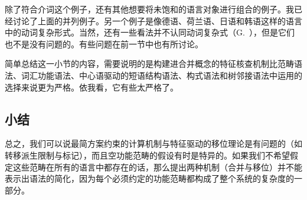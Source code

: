 除了符合介词这个例子，还有其他想要将未饱和的语言对象进行组合的例子。我已经讨论了上面的并列例子。另一个例子是像德语、荷兰语、日语和韩语这样的语言中的动词复杂形式。当然，还有一些看法并不认同动词复杂式（G.\ \citealp{GMueller98a,Wurmbrand2003b}），但是它们也不是没有问题的。有些问题在前一节中也有所讨论。

简单总结这一小节的内容，需要说明的是构建进合并概念的特征核查机制比范畴语法、词汇功能语法、中心语驱动的短语结构语法、构式语法和树邻接语法中运用的选择来说更为严格。依我看，它有些太严格了。

\subsection{小结}

总之，我们可以说最简方案约束的计算机制与特征驱动的移位理论是有问题的（如转移派生限制与标记），而且空功能范畴的假设有时是特异的。如果我们不希望假定这些范畴在所有的语言中都存在的话，那么提出两种机制（合并与移位）并不能表示出语法的简化，因为每个必须约定的功能范畴都构成了整个系统的复杂度的一部分。

